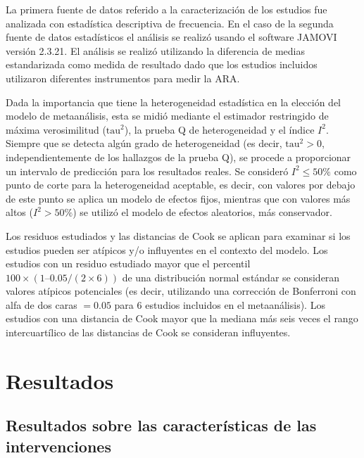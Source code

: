 \documentclass[spanish]{textolivre}
\begin{document}
La primera fuente de datos referido a la caracterización de los estudios fue analizada con estadística descriptiva de frecuencia. En el caso de la segunda fuente de datos estadísticos el análisis se realizó usando el software JAMOVI versión 2.3.21. El análisis se realizó utilizando la diferencia de medias estandarizada como medida de resultado dado que los estudios incluidos utilizaron diferentes instrumentos para medir la ARA. 

Dada la importancia que tiene la heterogeneidad estadística en la elección del modelo de metaanálisis, esta se midió mediante el estimador restringido de máxima verosimilitud ($\text{tau}^2$), la prueba Q de heterogeneidad y el índice $I^2$. Siempre que se detecta algún grado de heterogeneidad (es decir, $\text{tau}^2 > 0$, independientemente de los hallazgos de la prueba Q), se procede a proporcionar un intervalo de predicción para los resultados reales. Se consideró $I^2 \leq 50\%$ como punto de corte para la heterogeneidad aceptable, es decir, con valores por debajo de este punto se aplica un modelo de efectos fijos, mientras que con valores más altos ($I^2 >50\%$) se utilizó el modelo de efectos aleatorios, más conservador. 

Los residuos estudiados y las distancias de Cook se aplican para examinar si los estudios pueden ser atípicos y/o influyentes en el contexto del modelo. Los estudios con un residuo estudiado mayor que el percentil $100 \times (1 – 0.05/(2 \times 6))$ de una distribución normal estándar se consideran valores atípicos potenciales (es decir, utilizando una corrección de Bonferroni con alfa de dos caras $= 0.05$ para 6 estudios incluidos en el metaanálisis). Los estudios con una distancia de Cook mayor que la mediana más seis veces el rango intercuartílico de las distancias de Cook se consideran influyentes. 


\section{Resultados}

\subsection{Resultados sobre las características de las intervenciones}
\end{document}
